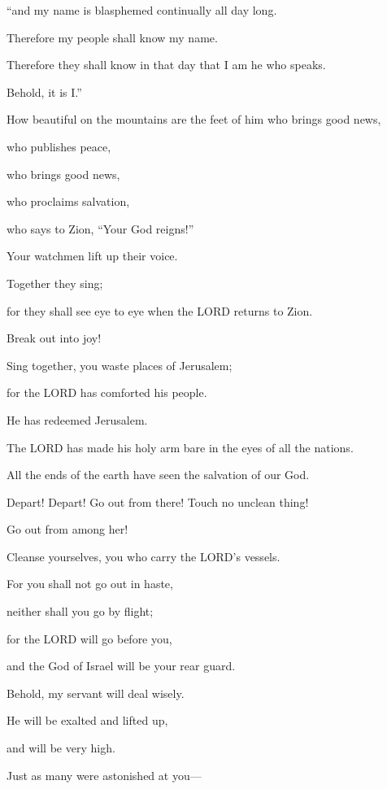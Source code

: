 “and my name is blasphemed continually all day long.

\myverse{}Therefore my people shall know my name.

Therefore they shall know in that day that I am he who speaks.

Behold, it is I.”


\vspace{\baselineskip} \myverse{}How beautiful on the mountains are the feet of him who brings
good news,

who publishes peace,

who brings good news,

who proclaims salvation,

who says to Zion, “Your God reigns!”

\myverse{}Your watchmen lift up their voice.

Together they sing;

for they shall see eye to eye when the LORD returns to Zion.

\myverse{}Break out into joy!

Sing together, you waste places of Jerusalem;

for the LORD has comforted his people.

He has redeemed Jerusalem.

\myverse{}The LORD has made his holy arm bare in the eyes of all the
nations.

All the ends of the earth have seen the salvation of our God.


\vspace{\baselineskip} \myverse{}Depart! Depart! Go out from there! Touch no unclean thing!

Go out from among her!

Cleanse yourselves, you who carry the LORD’s vessels.

\myverse{}For you shall not go out in haste,

neither shall you go by flight;

for the LORD will go before you,

and the God of Israel will be your rear guard.


\vspace{\baselineskip} \myverse{}Behold, my servant will deal wisely.

He will be exalted and lifted up,

and will be very high.

\myverse{}Just as many were astonished at you—

